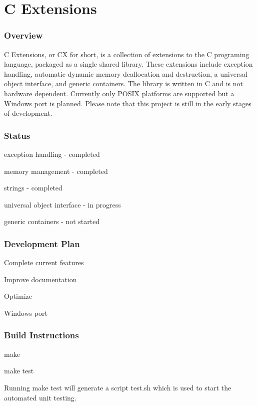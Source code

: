 \section*{C Extensions}

\subsubsection*{Overview}

C Extensions, or CX for short, is a collection of extensions to the C programing language, packaged as a single shared library. These extensions include exception handling, automatic dynamic memory deallocation and destruction, a universal object interface, and generic containers. The library is written in C and is not hardware dependent. Currently only P\+O\+S\+IX platforms are supported but a Windows port is planned. Please note that this project is still in the early stages of development. \subsubsection*{Status}


\begin{DoxyItemize}
\item exception handling -\/ completed 
\item memory management -\/ completed 
\item strings -\/ completed 
\item universal object interface -\/ in progress 
\item generic containers -\/ not started 
\end{DoxyItemize}\subsubsection*{Development Plan}


\begin{DoxyEnumerate}
\item Complete current features 
\item Improve documentation 
\item Optimize 
\item Windows port 
\end{DoxyEnumerate}\subsubsection*{Build Instructions}


\begin{DoxyItemize}
\item make 
\item make test 
\end{DoxyItemize}

Running \textquotesingle{}make test\textquotesingle{} will generate a script \textquotesingle{}test.\+sh\textquotesingle{} which is used to start the automated unit testing. 